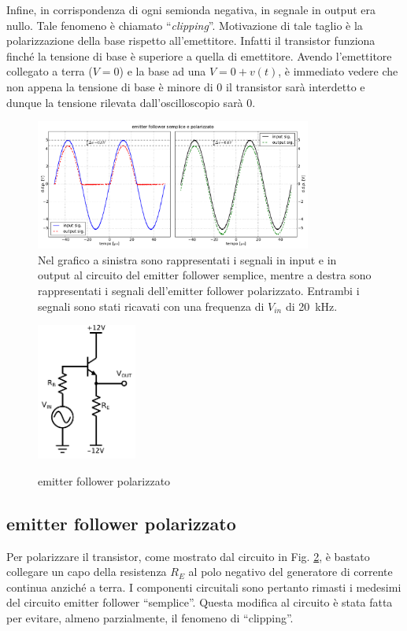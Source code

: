 Infine, in corrispondenza di ogni semionda negativa, in segnale in output era nullo.
Tale fenomeno è chiamato ``\emph{clipping}''. Motivazione di tale taglio è la polarizzazione della base rispetto all'emettitore. Infatti il transistor funziona finché la tensione di base è superiore a quella di emettitore. Avendo l'emettitore collegato a terra ($V=0$) e la base ad una $V=0+v(t)$, è immediato vedere che non appena la tensione di base è minore di 0 il transistor sarà interdetto e dunque la tensione rilevata dall'oscilloscopio sarà 0.

\begin{figure}[H]
\centering
	\includegraphics[width=0.81\textwidth]{cc3+cc4.pdf}
	\caption{Nel grafico a sinistra sono rappresentati i segnali in input e in output al circuito del emitter follower semplice, mentre a destra sono rappresentati i segnali dell'emitter follower polarizzato. Entrambi i segnali sono stati ricavati con una frequenza di $V_{in}$ di \SI{20}{\kilo\hertz}.}
	\label{fig:cc3+cc4}
\end{figure}

\begin{figure}
	\caption{emitter follower polarizzato}
	\includegraphics[height=45mm]{cc4.pdf}
	\label{fig:cc4}
\end{figure}

\subsection{emitter follower polarizzato}
Per polarizzare il transistor, come mostrato dal circuito in Fig. \ref{fig:cc4}, è bastato collegare un capo della resistenza $R_E$ al polo negativo del generatore di corrente continua anziché a terra.
I componenti circuitali sono pertanto rimasti i medesimi del circuito emitter follower ``semplice''.
Questa modifica al circuito è stata fatta per evitare, almeno parzialmente, il fenomeno di ``clipping''.

